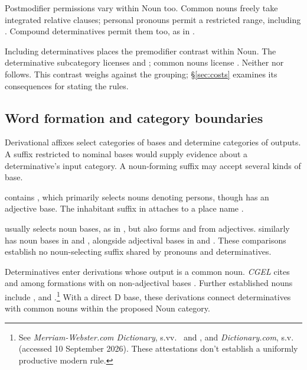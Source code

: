 \documentclass[12pt]{article}
\begin{document}
Postmodifier permissions vary within Noun too. Common nouns freely take integrated relative clauses; personal pronouns permit a restricted range, including  \citep[430]{huddleston2002}. Compound determinatives permit them too, as in  \citep[423--424]{huddleston2002}.

Including determinatives places the premodifier contrast within Noun. The determinative subcategory licenses  and ; common nouns license . Neither  nor  follows. This contrast weighs against the grouping; §\ref{sec:costs} examines its consequences for stating the rules.

\subsection{Word formation and category boundaries}\label{sec:word-formation}

Derivational affixes select categories of bases and determine categories of outputs. A suffix restricted to nominal bases would supply evidence about a determinative's input category. A noun-forming suffix may accept several kinds of base.

 contains , which primarily selects nouns denoting persons, though  has an adjective base. The inhabitant suffix  in  attaches to a place name \citep[Ch.~19, §§5.6.2(b), 5.7.2(k)]{huddleston2002}.

 usually selects noun bases, as in , but also forms  and  from adjectives.  similarly has noun bases in  and , alongside adjectival bases in  and  \citep[Ch.~19, §5.7.2(e--f)]{huddleston2002}. These comparisons establish no noun-selecting suffix shared by pronouns and determinatives.

Determinatives enter derivations whose output is a common noun. \textit{CGEL} cites  and  among formations with  on non-adjectival bases \citep[Ch.~19, §5.7.2(i)]{huddleston2002}. Further established nouns include ,  and .\footnote{See \textit{Merriam-Webster.com Dictionary}, s.vv.\ \href{https://www.merriam-webster.com/dictionary/thisness}{} and \href{https://www.merriam-webster.com/dictionary/fewness}{}, and \textit{Dictionary.com}, s.v.\ \href{https://www.dictionary.com/browse/muchness}{} (accessed 10 September 2026). These attestations don't establish a uniformly productive modern rule.} With a direct D base, these derivations connect determinatives with common nouns within the proposed Noun category.
\end{document}
